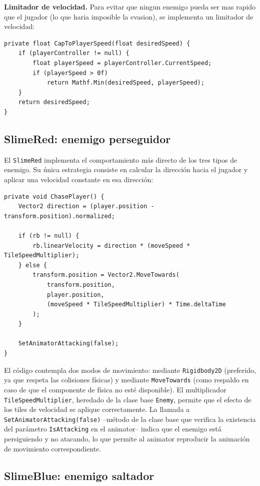\textbf{Limitador de velocidad.} Para evitar que ningun enemigo pueda ser mas rapido que el jugador (lo que haria imposible la evasion), se implementa un limitador de velocidad:

\begin{lstlisting}
private float CapToPlayerSpeed(float desiredSpeed) {
    if (playerController != null) {
        float playerSpeed = playerController.CurrentSpeed;
        if (playerSpeed > 0f)
            return Mathf.Min(desiredSpeed, playerSpeed);
    }
    return desiredSpeed;
}
\end{lstlisting}


\subsection{SlimeRed: enemigo perseguidor}


El \texttt{SlimeRed} implementa el comportamiento más directo de los tres tipos de enemigo. Su única estrategia consiste en calcular la dirección hacia el jugador y aplicar una velocidad constante en esa dirección:

\begin{lstlisting}
private void ChasePlayer() {
    Vector2 direction = (player.position - transform.position).normalized;
    
    if (rb != null) {
        rb.linearVelocity = direction * (moveSpeed * TileSpeedMultiplier);
    } else {
        transform.position = Vector2.MoveTowards(
            transform.position, 
            player.position, 
            (moveSpeed * TileSpeedMultiplier) * Time.deltaTime
        );
    }
    
    SetAnimatorAttacking(false);
}
\end{lstlisting}


El código contempla dos modos de movimiento: mediante \texttt{Rigidbody2D} (preferido, ya que respeta las colisiones físicas) y mediante \texttt{MoveTowards} (como respaldo en caso de que el componente de física no esté disponible). El multiplicador \texttt{TileSpeedMultiplier}, heredado de la clase base \texttt{Enemy}, permite que el efecto de los tiles de velocidad se aplique correctamente. La llamada a \texttt{SetAnimatorAttacking(false)} --método de la clase base que verifica la existencia del parámetro \texttt{IsAttacking} en el animator-- indica que el enemigo está persiguiendo y no atacando, lo que permite al animator reproducir la animación de movimiento correspondiente.

\subsection{SlimeBlue: enemigo saltador}



